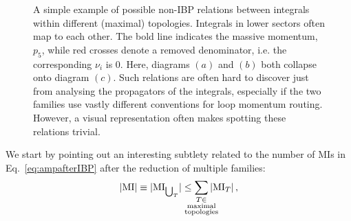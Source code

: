 \documentclass[main.tex]{subfiles}
\begin{document}
\begin{figure}
\begin{adjustbox}{minipage=\textwidth,scale=0.9}
{\begin{subfigure}[b]{0.25\linewidth}
    \caption{}
    \end{subfigure}
    }
    \end{adjustbox}
\caption{A simple example of possible non-IBP relations between integrals within different (maximal) topologies. Integrals in lower sectors often map to each other. The bold line indicates the massive momentum, $p_5$, while red crosses denote a removed denominator, i.e. the corresponding $\nu_i$ is 0. Here, diagrams $(a)$ and $(b)$ both collapse onto diagram $(c)$. Such relations are often hard to discover just from analysing the propagators of the integrals, especially if the two families use vastly different conventions for loop momentum routing. However, a visual representation often makes spotting these relations trivial.}
\label{fig:symmetryrelation}
\end{figure}
We start by pointing out an interesting subtlety related to the number of MIs in Eq.~\ref{eq:ampafterIBP} after the reduction of multiple families:
\begin{equation} \label{eq:noofmis}
    |\text{MI}| \equiv |\text{MI}_{\bigcup_T}| \le \sum_{\mathclap{\substack{T \in \\ \text{maximal} \\ \text{topologies}}}} |\text{MI}_T| \,,
\end{equation}
\end{document}
